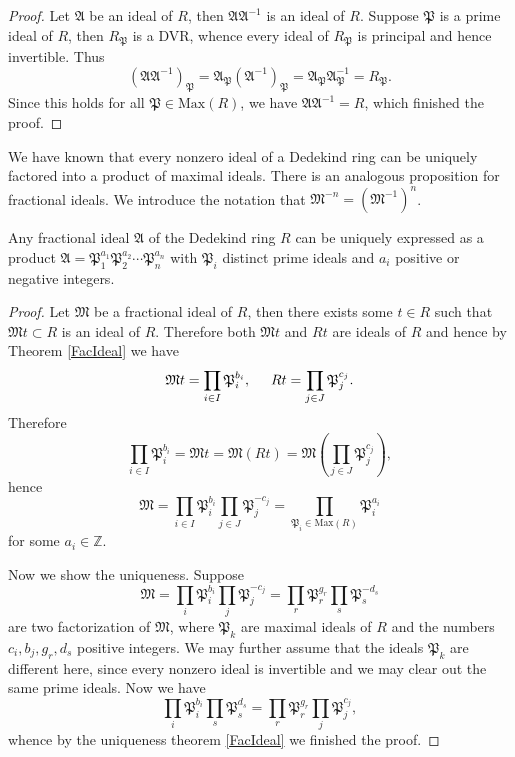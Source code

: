 \begin{proof}
Let $\mathfrak{A}$ be an ideal of $R$, then $\mathfrak{A}\mathfrak{A}^{-1}$ is an ideal of $R$. Suppose $\mathfrak{P}$ is a prime ideal of $R$, then $R_\mathfrak{P}$ is a DVR, whence every ideal of $R_\mathfrak{P}$ is principal and hence invertible. Thus 
$$
\left( \mathfrak{A} \mathfrak{A} ^{-1} \right) _{\mathfrak{P}}=\mathfrak{A} _{\mathfrak{P}}\left( \mathfrak{A} ^{-1} \right) _{\mathfrak{P}}=\mathfrak{A} _{\mathfrak{P}}\mathfrak{A} _{\mathfrak{P}}^{-1}=R_{\mathfrak{P}}.
$$
Since this holds for all $\mathfrak{P}\in\mathrm{Max}(R)$, we have $\mathfrak{AA}^{-1}=R$, which finished the proof.
\end{proof}
We have known that every nonzero ideal of a Dedekind ring can be uniquely factored into a product of maximal ideals. There is an analogous proposition for fractional ideals. We introduce the notation that $\mathfrak{M}^{-n}=(\mathfrak{M}^{-1})^n$.
\begin{theorem}
Any fractional ideal $\mathfrak{A}$ of the Dedekind ring $R$ can be uniquely expressed as a product $\mathfrak{A}=\mathfrak{P}_1^{a_1}\mathfrak{P}_2^{a_2}\cdots\mathfrak{P}_n^{a_n}$ with $\mathfrak{P}_i$ distinct prime ideals and $a_i$ positive or negative integers.
\end{theorem}
\begin{proof}
Let $\mathfrak{M}$ be a fractional ideal of $R$, then there exists some $t\in R$ such that $\mathfrak{M}t\subset R$ is an ideal of $R$. Therefore both $\mathfrak{M}t$ and $Rt$ are ideals of $R$ and hence by Theorem \ref{FacIdeal} we have 
$$
\mathfrak{M} t=\prod_{i\in I}{\mathfrak{P} _{i}^{b_i}},\hspace{0.5cm}Rt=\prod_{j\in J}{\mathfrak{P} _{j}^{c_j}}.
$$
Therefore 
$$
\prod_{i\in I}{\mathfrak{P} _{i}^{b_i}}=\mathfrak{M} t=\mathfrak{M} \left( Rt \right) =\mathfrak{M} \left( \prod_{j\in J}{\mathfrak{P} _{j}^{c_j}} \right) ,
$$
hence 
$$
\mathfrak{M} =\prod_{i\in I}{\mathfrak{P} _{i}^{b_i}}\prod_{j\in J}{\mathfrak{P} _{j}^{-c_j}}=\prod_{\mathfrak{P} _i\in \mathrm{Max}\left( R \right)}{\mathfrak{P} _{i}^{a_i}}
$$
for some $a_i\in\mathbb{Z}$.\par
Now we show the uniqueness. Suppose 
$$
\mathfrak{M} =\prod_i{\mathfrak{P} _{i}^{b_i}}\prod_j{\mathfrak{P} _{j}^{-c_j}}=\prod_r{\mathfrak{P} _{r}^{g_r}}\prod_s{\mathfrak{P} _{s}^{-d_s}}
$$
are two factorization of $\mathfrak{M}$, where $\mathfrak{P}_k$ are maximal ideals of $R$ and the numbers $c_i,b_j,g_r,d_s$ positive integers. We may further assume that the ideals $\mathfrak{P}_k$ are different here, since every nonzero ideal is invertible and we may clear out the same prime ideals. Now we have 
$$
\prod_i{\mathfrak{P} _{i}^{b_i}}\prod_s{\mathfrak{P} _{s}^{d_s}}=\prod_r{\mathfrak{P} _{r}^{g_r}}\prod_j{\mathfrak{P} _{j}^{c_j}},
$$
whence by the uniqueness theorem \ref{FacIdeal} we finished the proof.
\end{proof}
